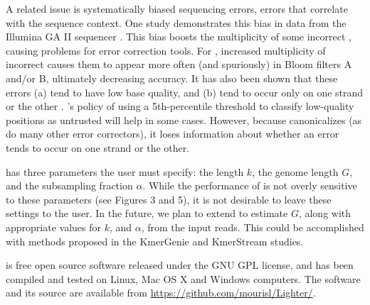\documentclass{bmcart}
\begin{document}
A related issue is systematically biased sequencing errors, \thatis errors that correlate with the sequence context.
One study demonstrates this bias in data from the Illumina GA II sequencer \cite{nakamura2011sequence}.
This bias boosts the multiplicity of some incorrect \kmers, causing problems for error correction tools.
For \tool, increased multiplicity of incorrect \kmers causes them to appear more often (and spuriously) in Bloom filters A and/or B, ultimately decreasing accuracy.
It has also been shown that these errors (a) tend to have low base quality, and (b) tend to occur only on one strand or the other \cite{nakamura2011sequence}.
\tool's policy of using a 5th-percentile threshold to classify low-quality positions as untrusted will help in some cases.
However, because \tool canonicalizes \kmers (as do many other error correctors), it loses information about whether an error tends to occur on one strand or the other.

\tool has three parameters the user must specify: the \kmer length $k$, the genome length $G$, and the subsampling fraction $\alpha$.
While the performance of \tool is not overly sensitive to these parameters (see Figures 3 and 5), it is not desirable to leave these settings to the user.
In the future, we plan to extend \tool to estimate $G$, along with appropriate values for $k$, and $\alpha$, from the input reads.
This could be accomplished with methods proposed in the KmerGenie \cite{chikhi2014informed} and KmerStream \cite{melsted2014kmerstream} studies.

\tool is free open source software released under the GNU GPL license, and has been compiled and tested on Linux, Mac OS X and Windows computers.  The software and its source are available from \url{https://github.com/mourisl/Lighter/}.

\end{document}
